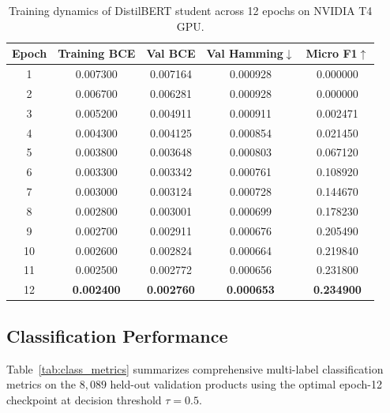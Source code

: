 \documentclass[11pt]{article}
\begin{document}
\begin{table}[ht]
  \centering
  \small
  \setlength{\tabcolsep}{4.5pt}
  \caption{Training dynamics of DistilBERT student across 12 epochs on NVIDIA T4 GPU.}
  \label{tab:training_dynamics}
  \begin{tabular}{ccccc}
    \toprule
    \textbf{Epoch} & \textbf{Training BCE} & \textbf{Val BCE} & \textbf{Val Hamming}$\downarrow$ & \textbf{Micro F1}$\uparrow$ \\
    \midrule
    1  & 0.007300 & 0.007164 & 0.000928 & 0.000000 \\
    2  & 0.006700 & 0.006281 & 0.000928 & 0.000000 \\
    3  & 0.005200 & 0.004911 & 0.000911 & 0.002471 \\
    4  & 0.004300 & 0.004125 & 0.000854 & 0.021450 \\
    5  & 0.003800 & 0.003648 & 0.000803 & 0.067120 \\
    6  & 0.003300 & 0.003342 & 0.000761 & 0.108920 \\
    7  & 0.003000 & 0.003124 & 0.000728 & 0.144670 \\
    8  & 0.002800 & 0.003001 & 0.000699 & 0.178230 \\
    9  & 0.002700 & 0.002911 & 0.000676 & 0.205490 \\
    10 & 0.002600 & 0.002824 & 0.000664 & 0.219840 \\
    11 & 0.002500 & 0.002772 & 0.000656 & 0.231800 \\
    12 & \textbf{0.002400} & \textbf{0.002760} & \textbf{0.000653} & \textbf{0.234900} \\
    \bottomrule
  \end{tabular}
\end{table}

\subsection{Classification Performance}
Table~\ref{tab:class_metrics} summarizes comprehensive multi-label classification metrics on the $8{,}089$ held-out validation products using the optimal epoch-12 checkpoint at decision threshold $\tau = 0.5$.
\end{document}
